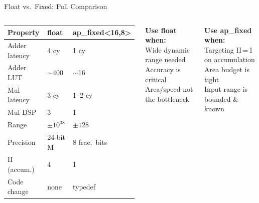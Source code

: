 \documentclass[aspectratio=169,12pt]{beamer}
\begin{document}
\begin{frame}{Float vs.\ Fixed: Full Comparison}
\vspace{0.15cm}
\begin{columns}[T,totalwidth=\textwidth]


  \begin{tabular}{p{2.4cm}p{1.5cm}p{1.8cm}}
    \hline
    \rowcolor{Navy!10}\textbf{Property} & \textbf{float} & \textbf{ap\_fixed<16,8>}\\
    \hline
    Adder latency   & 4 cy        & 1 cy\\
    \rowcolor{Navy!5}Adder LUT       & $\sim$400   & $\sim$16\\
    Mul latency     & 3 cy        & 1--2 cy\\
    \rowcolor{Navy!5}Mul DSP         & 3           & 1\\
    Range           & $\pm 10^{38}$ & $\pm128$\\
    \rowcolor{Navy!5}Precision       & 24-bit M    & 8 frac.\ bits\\
    II (accum.)     & 4           & 1\\
    \rowcolor{Navy!5}Code change     & none        & typedef\\
    \hline
  \end{tabular}

  \vspace{0.2cm}

  \colorbox{Orange!10}{\parbox{\dimexpr\linewidth-2\fboxsep\relax}{\vspace{4pt}
    {\color{Orange}\bfseries Use float when:}\\[2pt]
    {\small Wide dynamic range needed\\
    Accuracy is critical\\
    Area/speed not the bottleneck}
  \vspace{4pt}}}

  \vspace{8pt}
  \colorbox{Teal!10}{\parbox{\dimexpr\linewidth-2\fboxsep\relax}{\vspace{4pt}
    {\color{Teal}\bfseries Use ap\_fixed when:}\\[2pt]
    {\small Targeting II\,=\,1 on accumulation\\
    Area budget is tight\\
    Input range is bounded \& known}
  \vspace{4pt}}}

\end{columns}
\end{frame}
\end{document}
